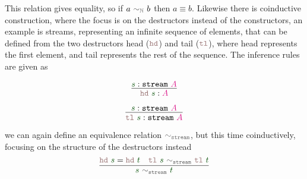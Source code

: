 \documentclass[twoside,11pt,openright]{report}
\theoremstyle{plain} %
\theoremstyle{definition}
\theoremstyle{remark}
\newcommand*{\term}[1]{\textcolor{green!30!black}{#1}} %
\newcommand*{\type}[1]{\textcolor{magenta!90!black}{#1}}
\newcommand*{\relation}[1]{\textcolor{gray!75!black}{\ensuremath{\mathtt{#1}}}}
\newcommand*{\destructor}[1]{\textcolor{pink!60!black}{\ensuremath{\mathtt{#1}}}}
\newcommand*{\typeformer}[1]{\ensuremath{\mathtt{#1}}}
\begin{document}
This relation gives equality, so if \(a~\relation{\sim_{\mathbb{N}}}~b\) then \(a \equiv b\). Likewise there is coinductive construction, where the focus is on the destructors instead of the constructors, an example is streams, representing an infinite sequence of elements, that can be defined from the two destructors head (\(\destructor{hd}\)) and tail (\(\destructor{tl}\)), where head represents the first element, and tail represents the rest of the sequence. The inference rules are given as
\begin{center}
  \strut
  \hfill
  \begin{minipage}{0.225\linewidth}
    \begin{equation}
      \vcenter{\infer{\destructor{hd}~\term{s} : \type{A}}{\term{s} : \typeformer{stream}~\type{A}}}
    \end{equation}
  \end{minipage}
  \hfill
  \begin{minipage}{0.25\linewidth}
    \begin{equation}
      \vcenter{\infer{\destructor{tl}~\term{s}: \typeformer{stream}~\type{A}}{\term{s} : \typeformer{stream}~\type{A}}}
    \end{equation}
  \end{minipage}
  \hfill
  \strut
\end{center}
we can again define an equivalence relation \(\relation{\sim_{stream}}\), but this time coinductively, focusing on the structure of the destructors instead
\begin{equation}
  \vcenter{\infer{\term{s}~\relation{\sim_{stream}}~\term{t}}{\destructor{hd}~\term{s} = \destructor{hd}~\term{t} & \destructor{tl}~\term{s}~\relation{\sim_{stream}}~\destructor{tl}~\term{t}}}
\end{equation}
\end{document}
